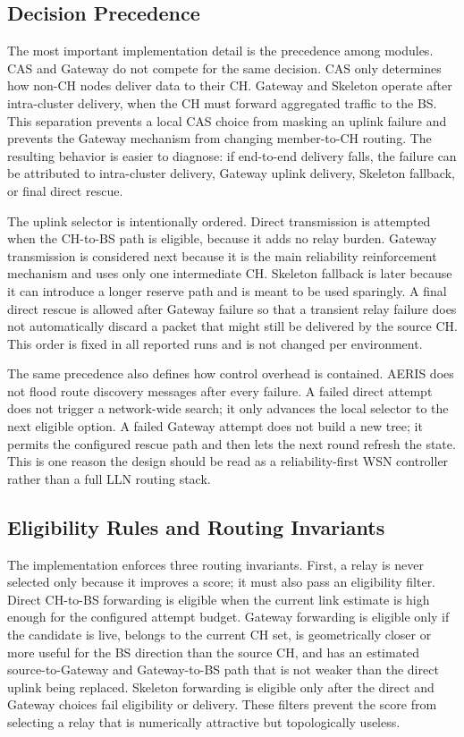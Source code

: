 \documentclass[conference]{IEEEtran}
\begin{document}
\subsection{Decision Precedence}
The most important implementation detail is the precedence among modules. CAS and Gateway do not compete for the same decision. CAS only determines how non-CH nodes deliver data to their CH. Gateway and Skeleton operate after intra-cluster delivery, when the CH must forward aggregated traffic to the BS. This separation prevents a local CAS choice from masking an uplink failure and prevents the Gateway mechanism from changing member-to-CH routing. The resulting behavior is easier to diagnose: if end-to-end delivery falls, the failure can be attributed to intra-cluster delivery, Gateway uplink delivery, Skeleton fallback, or final direct rescue.

The uplink selector is intentionally ordered. Direct transmission is attempted when the CH-to-BS path is eligible, because it adds no relay burden. Gateway transmission is considered next because it is the main reliability reinforcement mechanism and uses only one intermediate CH. Skeleton fallback is later because it can introduce a longer reserve path and is meant to be used sparingly. A final direct rescue is allowed after Gateway failure so that a transient relay failure does not automatically discard a packet that might still be delivered by the source CH. This order is fixed in all reported runs and is not changed per environment.

The same precedence also defines how control overhead is contained. AERIS does not flood route discovery messages after every failure. A failed direct attempt does not trigger a network-wide search; it only advances the local selector to the next eligible option. A failed Gateway attempt does not build a new tree; it permits the configured rescue path and then lets the next round refresh the state. This is one reason the design should be read as a reliability-first WSN controller rather than a full LLN routing stack.

\subsection{Eligibility Rules and Routing Invariants}
The implementation enforces three routing invariants. First, a relay is never selected only because it improves a score; it must also pass an eligibility filter. Direct CH-to-BS forwarding is eligible when the current link estimate is high enough for the configured attempt budget. Gateway forwarding is eligible only if the candidate is live, belongs to the current CH set, is geometrically closer or more useful for the BS direction than the source CH, and has an estimated source-to-Gateway and Gateway-to-BS path that is not weaker than the direct uplink being replaced. Skeleton forwarding is eligible only after the direct and Gateway choices fail eligibility or delivery. These filters prevent the score from selecting a relay that is numerically attractive but topologically useless.
\end{document}
